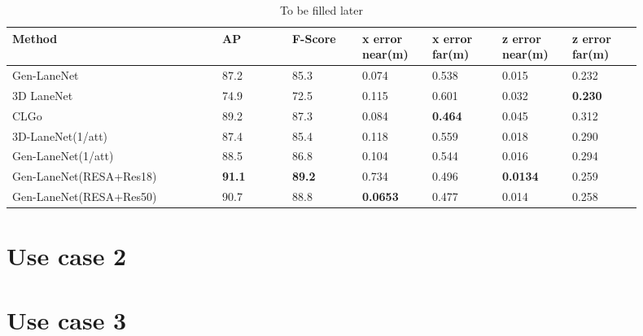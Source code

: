         \begin{table}[htbp]
    \centering
    \caption{To be filled later}
    \begin{tabular}{|p{0.3\linewidth}|p{0.1\linewidth}|p{0.1\linewidth}|p{0.1\linewidth}|p{0.1\linewidth}|p{0.1\linewidth}|p{0.1\linewidth}|}
    \hline
        \textbf{Method} & \textbf{AP} & \textbf{F-Score} & \textbf{x error near(m)} & \textbf{x error far(m)} & \textbf{z error near(m)} & \textbf{z error far(m)} \\ \hline
        Gen-LaneNet & 87.2 & 85.3 & 0.074 & 0.538 & 0.015 & 0.232 \\ \hline
        3D LaneNet & 74.9 & 72.5 & 0.115 & 0.601 & 0.032 & \textbf{0.230} \\ \hline
        CLGo & 89.2 & 87.3 & 0.084 & \textbf{0.464} & 0.045 & 0.312 \\ \hline
        3D-LaneNet(1/att) & 87.4 & 85.4 & 0.118 & 0.559 & 0.018 & 0.290 \\ \hline
        Gen-LaneNet(1/att) & 88.5 & 86.8 & 0.104 & 0.544 & 0.016 & 0.294 \\ \hline
        Gen-LaneNet(RESA+Res18) & \textbf{ 91.1} &\textbf{ 89.2} & 0.734 & 0.496 & \textbf{0.0134} & 0.259 \\ \hline
        Gen-LaneNet(RESA+Res50) & 90.7 & 88.8 & \textbf{0.0653} & 0.477 & 0.014 & 0.258 \\ \hline
    \end{tabular}
\end{table}
    \section{Use case 2}

    \section{Use case 3}

